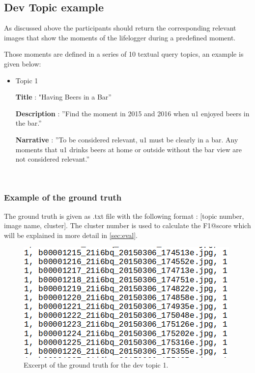     \newpage
    \subsection{Dev Topic example}
    \label{sec:devtopic1}
    As discussed above the participants should return the corresponding relevant images that show the moments of the lifelogger during a predefined moment. 
    
    Those moments are defined in a series of 10 textual query topics, an example is given below:


    \begin{itemize}
        \item Topic 1 
        
        \textbf{Title} : "Having Beers in a Bar”

        \textbf{Description} : ”Find the moment in 2015 and 2016 when u1 enjoyed beers in the bar.”

        \textbf{Narrative} : ”To be considered relevant, u1 must be clearly in a bar. Any moments that u1 drinks beers at home or outside without the bar view are not considered relevant.”
        


    \end{itemize}
    

    \
    \subsubsection{Example of the ground truth}


    The ground truth is given as .txt file with the following format : [topic number, image name, cluster].
    The cluster number is used to calculate the F1@score which will be explained in more detail in \ref{sec:eval}.


    \begin{figure}[htb]
        
        \centering
        \includegraphics[scale = 0.55]{Sections/5ImageClef/images/gt_t1.png}
        \caption{Excerpt of the ground truth for the dev topic 1.}  
        \label{fig:gt}
    \end{figure}


